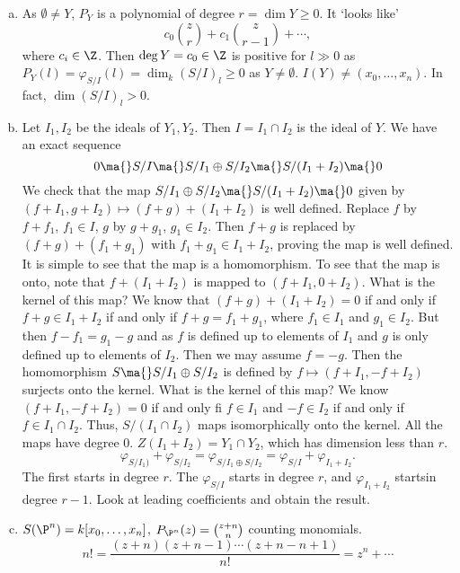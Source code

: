 \pf \hfill
\begin{enumerate}[(a)]
\item As $\emptyset \neq Y$, $P_Y$ is a polynomial of degree $r= \dim Y \geq 0$. It `looks like'
	\[
	c_0 \binom{z}{r} + c_1 \binom{z}{r-1} + \cdots,
	\]
where $c_i \in \Z$. Then $\deg Y= c_0 \in \Z$ is positive for $l \gg 0$ as $P_Y(l)= \varphi_{S/I}(l)= \dim_k(S/I)_l \geq 0$ as $Y \neq \emptyset$. $I(Y) \neq (x_0,\ldots,x_n)$. In fact, $\dim(S/I)_l > 0$.

\item Let $I_1, I_2$ be the ideals of $Y_1, Y_2$. Then $I= I_1 \cap I_2$ is the ideal of $Y$. We have an exact sequence
	\[
	0 \ma{} S/I \ma{} S/I_1 \oplus S/I_2 \ma{} S/(I_1+I_2) \ma{} 0
	\]
We check that the map $S/I_1 \oplus S/I_2 \ma{} S/(I_1+I_2) \ma{} 0$ given by $(f+I_1,g+I_2) \mapsto (f+g) + (I_1 + I_2)$ is well defined. Replace $f$ by $f+f_1$, $f_1 \in I$, $g$ by $g+g_1$, $g_1 \in I_2$. Then $f+g$ is replaced by $(f+g) + (f_1+g_1)$ with $f_1+g_1 \in I_1+I_2$, proving the map is well defined. It is simple to see that the map is a homomorphism. To see that the map is onto, note that $f + (I_1+I_2)$ is mapped to $(f+I_1,0+I_2)$. What is the kernel of this map? We know that $(f+g) + (I_1 + I_2)=0$ if and only if $f+g \in I_1 + I_2$ if and only if $f+g= f_1+g_1$, where $f_1 \in I_1$ and $g_1 \in I_2$. But then $f-f_1= g_1-g$ and as $f$ is defined up to elements of $I_1$ and $g$ is only defined up to elements of $I_2$. Then we may assume $f= -g$. Then the homomorphism $S \ma{} S/I_1 \oplus S/I_2$ is defined by $f \mapsto (f+I_1, -f+I_2)$ surjects onto the kernel. What is the kernel of this map? We know $(f+I_1, -f+I_2)= 0$ if and only fi $f \in I_1$ and $-f \in I_2$ if and only if $f \in I_1 \cap I_2$. Thus, $S/(I_1 \cap I_2)$ maps isomorphically onto the kernel. All the maps have degree 0. $Z(I_1+I_2)= Y_1 \cap Y_2$, which has dimension less than $r$.
	\[
	\varphi_{S/I_1)} + \varphi_{S/I_2}= \varphi_{S/I_1 \oplus S/I_2} = \varphi_{S/I} + \varphi_{I_1+I_2}.
	\]
The first starts in degree $r$. The $ \varphi_{S/I}$ starts in degree $r$, and $\varphi_{I_1+I_2}$ startsin degree $r-1$. Look at leading coefficients and obtain the result. 

\item $S(\P^n)= k[x_0,\ldots,x_n]$, $P_{\P^n}(z)= \binom{z+n}{n}$ counting monomials. 
	\[
	n!= \dfrac{(z+n)(z+n-1)\cdots(z+n-n+1)}{n!}= z^n + \cdots
	\]


\end{enumerate}
